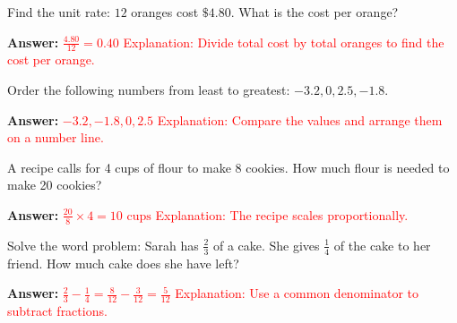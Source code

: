 \documentclass[12pt]{article}
\begin{document}
\begin{tcolorbox}[colframe=black!50, colback=white, title=\textbf{Problem 6 (6.RP.A.2)}]
Find the unit rate: \(12\) oranges cost \(\$4.80\). What is the cost per orange?

\textbf{Answer:} \textcolor{red}{\(\frac{4.80}{12} = 0.40\)}  
\textcolor{red}{Explanation: Divide total cost by total oranges to find the cost per orange.}
\end{tcolorbox}

\begin{tcolorbox}[colframe=black!50, colback=white, title=\textbf{Problem 7 (6.NS.C.7)}]
Order the following numbers from least to greatest: \(-3.2, 0, 2.5, -1.8\).

\textbf{Answer:} \textcolor{red}{\(-3.2, -1.8, 0, 2.5\)}  
\textcolor{red}{Explanation: Compare the values and arrange them on a number line.}
\end{tcolorbox}

\begin{tcolorbox}[colframe=black!50, colback=white, title=\textbf{Problem 8 (6.RP.A.3)}]
A recipe calls for 4 cups of flour to make 8 cookies. How much flour is needed to make 20 cookies?

\textbf{Answer:} \textcolor{red}{\(\frac{20}{8} \times 4 = 10 \text{ cups}\)}  
\textcolor{red}{Explanation: The recipe scales proportionally.}
\end{tcolorbox}

\begin{tcolorbox}[colframe=black!50, colback=white, title=\textbf{Problem 9 (6.NS.A.1)}]
Solve the word problem: Sarah has \(\frac{2}{3}\) of a cake. She gives \(\frac{1}{4}\) of the cake to her friend. How much cake does she have left?

\textbf{Answer:} \textcolor{red}{\(\frac{2}{3} - \frac{1}{4} = \frac{8}{12} - \frac{3}{12} = \frac{5}{12}\)}  
\textcolor{red}{Explanation: Use a common denominator to subtract fractions.}
\end{tcolorbox}
\end{document}

